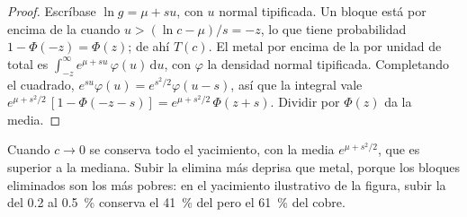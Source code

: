 \begin{proof}
Escríbase $\ln g = \mu + s u$, con $u$ normal tipificada. Un bloque está por encima de la  cuando $u > (\ln c -
\mu)/s = -z$, lo que tiene probabilidad $1 - \Phi(-z) = \Phi(z)$; de ahí $T(c)$. El metal por encima de la
 por unidad de  total es $\int_{-z}^{\infty} e^{\mu + s u}\,\varphi(u)\,\mathrm{d}u$,
con $\varphi$ la densidad normal tipificada. Completando el cuadrado, $e^{su}\varphi(u) =
e^{s^2/2}\varphi(u - s)$, así que la integral vale $e^{\mu + s^2/2}\,[1 - \Phi(-z - s)] = e^{\mu +
s^2/2}\,\Phi(z + s)$. Dividir por $\Phi(z)$ da la  media.
\end{proof}

Cuando $c \to 0$ se conserva todo el yacimiento, con la  media $e^{\mu + s^2/2}$, que es superior a la
mediana. Subir la  elimina  más deprisa que metal, porque los bloques eliminados son los
más pobres: en el yacimiento ilustrativo de la figura, subir la  del 0.2 al
\qty{0.5}{\percent} conserva el \qty{41}{\percent} del  pero el \qty{61}{\percent} del cobre.

